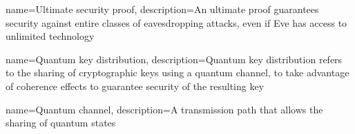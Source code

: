  {
name={Ultimate security proof},
description={An ultimate proof guarantees security against entire classes of eavesdropping attacks, even if Eve has access to unlimited technology}
}

 {name={Quantum key distribution},
description={Quantum key distribution refers to the sharing of cryptographic keys using a quantum channel, to take advantage of coherence effects to guarantee security of the resulting key}
}

 {
name={Quantum channel},
description={A transmission path that allows the sharing of quantum states}
}

